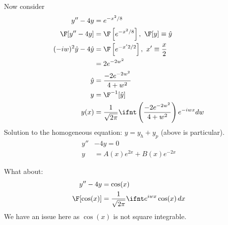 \documentclass[cplx.tex]{subfiles}
\begin{document}
Now consider
\begin{align}
    y'' -4y &= e^{-x^2/8} \\
    \F[y''-4y] &= \F\left[e^{-x^2/8}\right],~ \F[y] \equiv \hat{y} \\
    (-iw)^2\hat{y} - 4\hat{y} &= \F\left[e^{-x'2/2}\right],~ x' \equiv \frac{x}{2} \\
                              &= 2e^{-2w^2} \\
    \hat{y} &= \frac{-2e^{-2w^2}}{4+w^2} \\
    y &= \F^{-1}[\hat{y}] \\
    y(x) &= \frac{1}{\sqrt{2\pi}} \ifnt \left(\frac{-2e^{-2w^2}}{4+w^2}\right)e^{-iwx}dw 
\end{align}
Solution to the homogeneous equation: $y = y_h + y_p$ (above is particular).
\begin{align}
    y'' &- 4y = 0 \\
    y &= A(x)e^{2x} + B(x)e^{-2x}
\end{align}

What about:
\begin{align}
    y'' - 4y &= \cos(x) \\
    \F[\cos(x)] &= \frac{1}{\sqrt{2\pi}} \ifnt e^{iwx}\cos(x)\,dx
\end{align}
We have an issue here as $\cos(x)$ is not square integrable.
\end{document}
